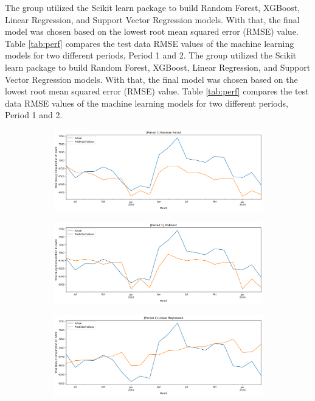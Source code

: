 \documentclass[runningheads]{llncs}
\begin{document}
The group utilized the Scikit learn package to build Random Forest, XGBoost, Linear Regression, and Support Vector Regression models. With that, the final model was chosen based on the lowest root mean squared error (RMSE) value. Table \ref{tab:perf} compares the test data RMSE values of the machine learning models for two different periods, Period 1 and 2. The group utilized the Scikit learn package to build Random Forest, XGBoost, Linear Regression, and Support Vector Regression models. With that, the final model was chosen based on the lowest root mean squared error (RMSE) value. Table \ref{tab:perf} compares the test data RMSE values of the machine learning models for two different periods, Period 1 and 2.

\begin{figure}[h]
    \begin{subfigure}[h]{\textwidth}
         \centering
         \includegraphics[width=\textwidth]{rf/p1-1-RF.png}
         \caption{}
         \label{fig:modelRF-p1}
    \end{subfigure}
    \begin{subfigure}[h]{\textwidth}
         \centering
         \includegraphics[width=\textwidth]{xgboost/p1-1-XGBoost.png}
         \caption{}
         \label{fig:modelRF-p2}
    \end{subfigure}
    \begin{subfigure}[h]{\textwidth}
         \centering
         \includegraphics[width=\textwidth]{lr/p1-1-LR.png}

\end{subfigure}
\end{figure}
\end{document}
